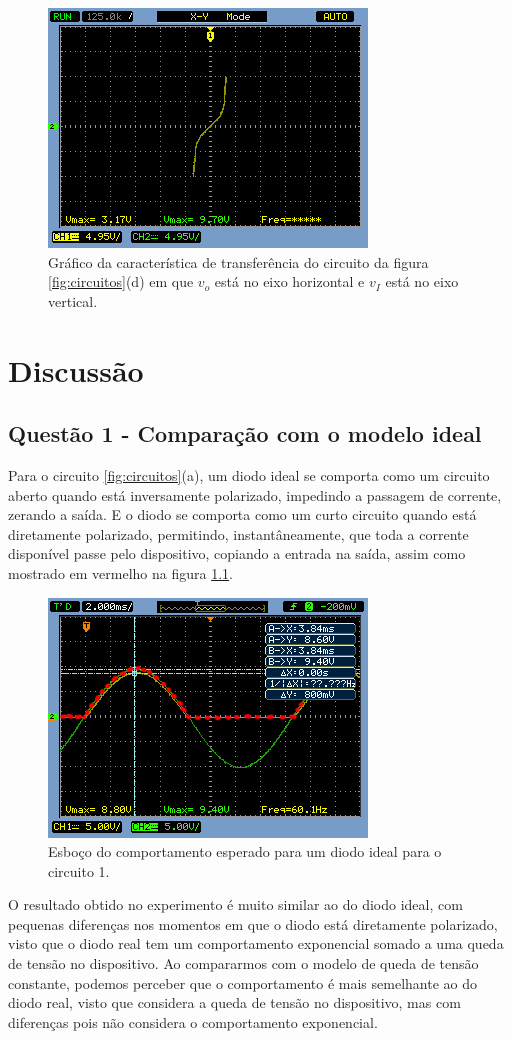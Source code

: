 \documentclass{abntex2}
\begin{document}
\begin{figure}[h]
  \centering
  \includegraphics[scale = 0.6]{diferenca-1d.png}
  \caption{Gráfico da característica de transferência do circuito da figura \ref{fig:circuitos}(d) em que $v_o$ está no eixo horizontal e $v_I$ está no eixo vertical.}
  \label{fig:diff4}
\end{figure}
\pagebreak
\chapter{Discussão}

\section{Questão 1 - Comparação com o modelo ideal}
Para o circuito \ref{fig:circuitos}(a), um diodo ideal se comporta como um circuito aberto quando está inversamente polarizado, impedindo a passagem de corrente, zerando a saída. E o diodo se comporta como um curto circuito quando está diretamente polarizado,
permitindo, instantâneamente, que toda a corrente disponível passe pelo dispositivo, copiando a entrada na saída, assim como mostrado em vermelho na figura \ref{fig:comp1}.

\begin{figure}[h]
  \centering
  \includegraphics[scale = .7]{circuito-1a-esboco.png}
  \caption{Esboço do comportamento esperado para um diodo ideal para o circuito 1.}
  \label{fig:comp1}
\end{figure}
\pagebreak
O resultado obtido no experimento é muito similar ao do diodo ideal, com pequenas diferenças nos momentos em que o diodo está diretamente polarizado, visto que o diodo real tem um comportamento exponencial somado a uma queda de tensão no dispositivo.
Ao compararmos com o modelo de queda de tensão constante, podemos perceber que o comportamento é mais semelhante ao do diodo real, visto que considera a queda de tensão no dispositivo, mas com diferenças pois não considera o comportamento exponencial.
\end{document}
